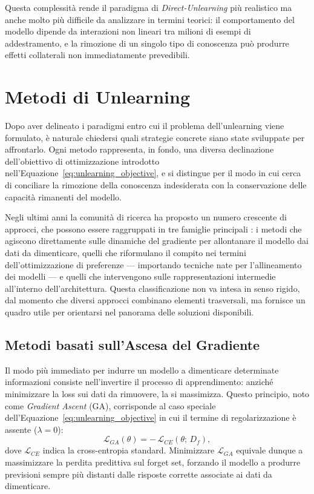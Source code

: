 Questa complessità rende il paradigma di \emph{Direct-Unlearning} più realistico ma anche molto più difficile da analizzare in termini teorici: il comportamento del modello dipende da interazioni non lineari tra milioni di esempi di addestramento, e la rimozione di un singolo tipo di conoscenza può produrre effetti collaterali non immediatamente prevedibili.

\section{Metodi di Unlearning}
\label{sec:metodi_unlearning}

Dopo aver delineato i paradigmi entro cui il problema dell'unlearning viene formulato, è naturale chiedersi quali strategie concrete siano state sviluppate per affrontarlo. Ogni metodo rappresenta, in fondo, una diversa declinazione dell'obiettivo di ottimizzazione introdotto nell'Equazione~\eqref{eq:unlearning_objective}, e si distingue per il modo in cui cerca di conciliare la rimozione della conoscenza indesiderata con la conservazione delle capacità rimanenti del modello.

Negli ultimi anni la comunità di ricerca ha proposto un numero crescente di approcci, che possono essere raggruppati in tre famiglie principali \cite{geng2025comprehensivesurveymachineunlearning, liu2024rethinkingmachineunlearninglarge}: i metodi che agiscono direttamente sulle dinamiche del gradiente per allontanare il modello dai dati da dimenticare, quelli che riformulano il compito nei termini dell'ottimizzazione di preferenze — importando tecniche nate per l'allineamento dei modelli — e quelli che intervengono sulle rappresentazioni intermedie all'interno dell'architettura. Questa classificazione non va intesa in senso rigido, dal momento che diversi approcci combinano elementi trasversali, ma fornisce un quadro utile per orientarsi nel panorama delle soluzioni disponibili.

\subsection{Metodi basati sull'Ascesa del Gradiente}

Il modo più immediato per indurre un modello a dimenticare determinate informazioni consiste nell'invertire il processo di apprendimento: anziché minimizzare la loss sui dati da rimuovere, la si massimizza. Questo principio, noto come \emph{Gradient Ascent} (GA), corrisponde al caso speciale dell'Equazione~\eqref{eq:unlearning_objective} in cui il termine di regolarizzazione è assente ($\lambda = 0$):
\begin{equation}
    \mathcal{L}_{GA}(\theta) = -\,\mathcal{L}_{CE}(\theta;\, D_f),
    \label{eq:gradient_ascent}
\end{equation}
dove $\mathcal{L}_{CE}$ indica la cross-entropia standard. Minimizzare $\mathcal{L}_{GA}$ equivale dunque a massimizzare la perdita predittiva sul forget set, forzando il modello a produrre previsioni sempre più distanti dalle risposte corrette associate ai dati da dimenticare.

